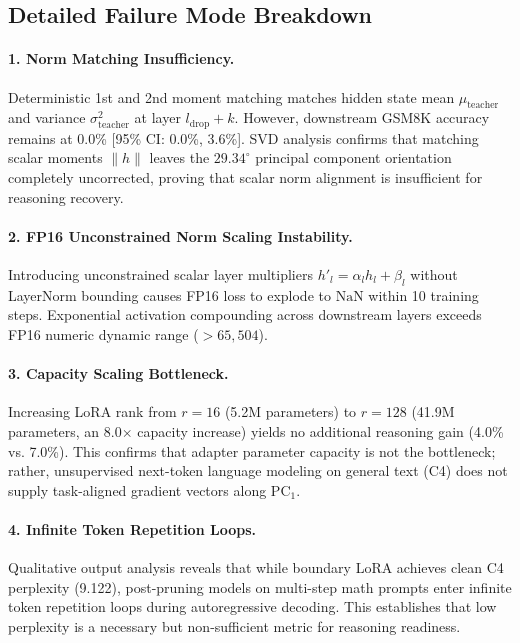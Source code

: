 \documentclass[11pt]{article}
\begin{document}
\subsection{Detailed Failure Mode Breakdown}

\paragraph{1. Norm Matching Insufficiency.}
Deterministic 1st and 2nd moment matching matches hidden state mean $\mu_{\text{teacher}}$ and variance $\sigma_{\text{teacher}}^2$ at layer $l_{\text{drop}}+k$. However, downstream GSM8K accuracy remains at 0.0\% [95\% CI: 0.0\%, 3.6\%]. SVD analysis confirms that matching scalar moments $\|h\|$ leaves the $29.34^\circ$ principal component orientation completely uncorrected, proving that scalar norm alignment is insufficient for reasoning recovery.

\paragraph{2. FP16 Unconstrained Norm Scaling Instability.}
Introducing unconstrained scalar layer multipliers $h'_{l} = \alpha_l h_l + \beta_l$ without LayerNorm bounding causes FP16 loss to explode to $\text{NaN}$ within 10 training steps. Exponential activation compounding across downstream layers exceeds FP16 numeric dynamic range ($>65,504$).

\paragraph{3. Capacity Scaling Bottleneck.}
Increasing LoRA rank from $r=16$ (5.2M parameters) to $r=128$ (41.9M parameters, an 8.0$\times$ capacity increase) yields no additional reasoning gain (4.0\% vs. 7.0\%). This confirms that adapter parameter capacity is not the bottleneck; rather, unsupervised next-token language modeling on general text (C4) does not supply task-aligned gradient vectors along $\mathrm{PC}_1$.

\paragraph{4. Infinite Token Repetition Loops.}
Qualitative output analysis reveals that while boundary LoRA achieves clean C4 perplexity (9.122), post-pruning models on multi-step math prompts enter infinite token repetition loops during autoregressive decoding. This establishes that low perplexity is a necessary but non-sufficient metric for reasoning readiness.
\end{document}
